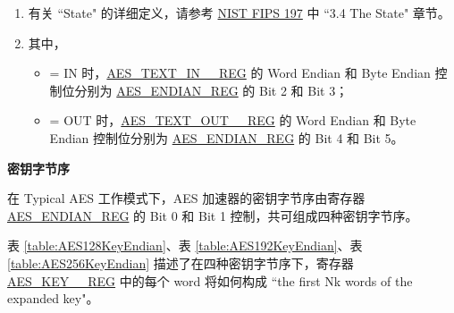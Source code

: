 \documentclass[main\_\_CN.tex]{subfiles}
\begin{document}
\begin{tiplisting}
\vspace{-2em}
\begin{enumerate}
\item 有关 ``State" 的详细定义，请参考 \href{https://nvlpubs.nist.gov/nistpubs/FIPS/NIST.FIPS.197.pdf}{NIST FIPS 197} 中 ``3.4 The State" 章节。
\item 其中，
\begin{itemize}
    \item {} = IN 时，\hyperref[regdesc:AESTEXTINnREG]{AES\_TEXT\_IN\_\_REG} 的 Word Endian 和 Byte Endian 控制位分别为 \hyperref[regdesc:AESENDIANREG]{AES\_ENDIAN\_REG} 的 Bit 2 和 Bit 3；
    \item {} = OUT 时，\hyperref[regdesc:AESTEXTINnREG]{AES\_TEXT\_OUT\_\_REG} 的 Word Endian 和 Byte Endian 控制位分别为 \hyperref[regdesc:AESENDIANREG]{AES\_ENDIAN\_REG} 的 Bit 4 和 Bit 5。
\end{itemize}
\end{enumerate}
\end{tiplisting}

\textbf{密钥字节序}

在 Typical AES 工作模式下，AES 加速器的密钥字节序由寄存器 \hyperref[regdesc:AESENDIANREG]{AES\_ENDIAN\_REG} 的 Bit 0 和 Bit 1 控制，共可组成四种密钥字节序。

表 \ref{table:AES128KeyEndian}、表 \ref{table:AES192KeyEndian}、表 \ref{table:AES256KeyEndian} 描述了在四种密钥字节序下，寄存器 \hyperref[regdesc:AESKEYnREG]{AES\_KEY\_\_REG} 中的每个 word 将如何构成 ``the first Nk words of the expanded key"。
\end{document}
